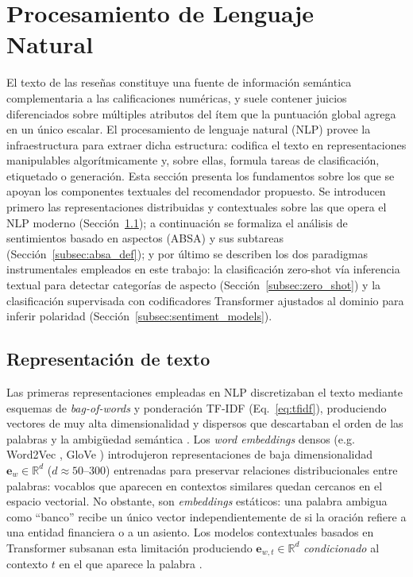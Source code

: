 \section{Procesamiento de Lenguaje Natural} \label{sec:nlp}

El texto de las reseñas constituye una fuente de información semántica complementaria a las calificaciones numéricas, y suele contener juicios diferenciados sobre múltiples atributos del ítem que la puntuación global agrega en un único escalar. El procesamiento de lenguaje natural (NLP) provee la infraestructura para extraer dicha estructura: codifica el texto en representaciones manipulables algorítmicamente y, sobre ellas, formula tareas de clasificación, etiquetado o generación. Esta sección presenta los fundamentos sobre los que se apoyan los componentes textuales del recomendador propuesto. Se introducen primero las representaciones distribuidas y contextuales sobre las que opera el NLP moderno (Sección~\ref{subsec:text_repr}); a continuación se formaliza el análisis de sentimientos basado en aspectos (ABSA) y sus subtareas (Sección~\ref{subsec:absa_def}); y por último se describen los dos paradigmas instrumentales empleados en este trabajo: la clasificación zero-shot vía inferencia textual para detectar categorías de aspecto (Sección~\ref{subsec:zero_shot}) y la clasificación supervisada con codificadores Transformer ajustados al dominio para inferir polaridad (Sección~\ref{subsec:sentiment_models}).

\subsection{Representación de texto} \label{subsec:text_repr}

Las primeras representaciones empleadas en NLP discretizaban el texto mediante esquemas de \textit{bag-of-words} y ponderación TF-IDF (Eq.~\ref{eq:tfidf}), produciendo vectores de muy alta dimensionalidad y dispersos que descartaban el orden de las palabras y la ambigüedad semántica \citep{aggarwal_recommender_2016}. Los \textit{word embeddings} densos (e.g. Word2Vec \citep{mikolov_efficient_2013}, GloVe \citep{pennington2014glove}) introdujeron representaciones de baja dimensionalidad $\mathbf{e}_w \in \mathbb{R}^d$ ($d \approx 50$--$300$) entrenadas para preservar relaciones distribucionales entre palabras: vocablos que aparecen en contextos similares quedan cercanos en el espacio vectorial. No obstante, son \textit{embeddings} estáticos: una palabra ambigua como ``banco'' recibe un único vector independientemente de si la oración refiere a una entidad financiera o a un asiento. Los modelos contextuales basados en Transformer \citep{vaswani_attention_2017} subsanan esta limitación produciendo $\mathbf{e}_{w,t} \in \mathbb{R}^d$ \emph{condicionado} al contexto $t$ en el que aparece la palabra \citep{devlin_bert_2019}.

